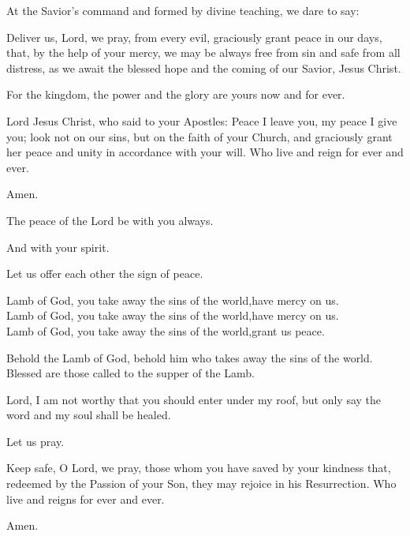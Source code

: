\pr At the Savior’s command and formed by divine teaching, we dare to say:



\pr Deliver us, Lord, we pray, from every evil, graciously grant peace in our days, that, by the help of your mercy, we may be always free from sin and safe from all distress, as we await the blessed hope and the coming of our Savior, Jesus Christ.

\be For the kingdom, the power and the glory are yours now and for ever.

\pr Lord Jesus Christ, who said to your Apostles: Peace I leave you, my peace I give you; look not on our sins, but on the faith of your Church, and graciously grant her peace and unity in accordance with your will. Who live and reign for ever and ever.

\be Amen.

\pr The peace of the Lord be with you always.

\be And with your spirit.

\pr Let us offer each other the sign of peace.

\be Lamb of God, you take away the sins of the world,\redast have mercy on us.\\
\indent\be Lamb of God, you take away the sins of the world,\redast have mercy on us.\\
\indent\be Lamb of God, you take away the sins of the world,\redast grant us peace.

\pr Behold the Lamb of God, behold him who takes away the sins of the world. Blessed are those called to the supper of the Lamb.

\be Lord, I am not worthy that you should enter under my roof, but only say the word and my soul shall be healed.

\pr Let us pray.

\pr Keep safe, O Lord, we pray, those whom you have saved by your kindness that, redeemed by the Passion of your Son, they may rejoice in his Resurrection. Who live and reigns for ever and ever.

\be Amen.